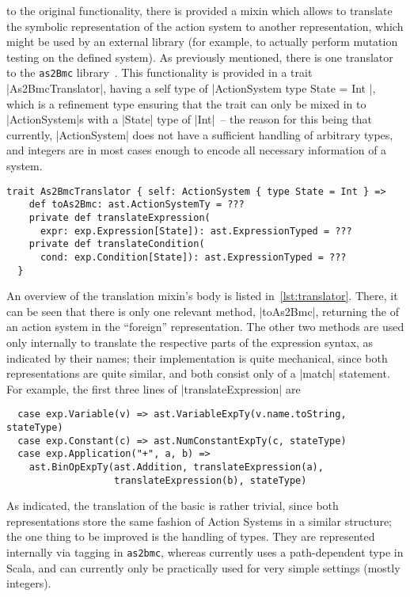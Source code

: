  to the original functionality, there is provided a mixin which
allows to translate the symbolic representation of the action system to another representation,
which might be used by an external library (for example, to actually perform mutation testing on the
defined system). As previously mentioned, there is one translator to the \texttt{as2Bmc}
library~\cite{maderbacher2016:weak}. This functionality is provided in a trait |As2BmcTranslator|,
having a self type of |ActionSystem { type State = Int }|, which is a refinement type ensuring that
the trait can only be mixed in to |ActionSystem|s with a |State| type of |Int|~-- the reason for
this being that currently, |ActionSystem| does not have a sufficient handling of arbitrary types,
and integers are in most cases enough to encode all necessary information of a system.

\begin{lstlisting}[style=floating, label=lst:translator,
  caption={Overview of the body of \texttt{As2BmcTranslator}. The actual implementations are
    left out.}]
  trait As2BmcTranslator { self: ActionSystem { type State = Int } =>
    def toAs2Bmc: ast.ActionSystemTy = ???
    private def translateExpression(
      expr: exp.Expression[State]): ast.ExpressionTyped = ???
    private def translateCondition(
      cond: exp.Condition[State]): ast.ExpressionTyped = ???
  }
\end{lstlisting}

An overview of the translation mixin's body is listed in~\autoref{lst:translator}. There, it can be
seen that there is only one relevant method, |toAs2Bmc|, returning the  of an action
system in the \enquote{foreign} representation. The other two methods are used only internally to
translate the respective parts of the expression syntax, as indicated by their names; their
implementation is quite mechanical, since both representations are quite similar, and both consist
only of a |match| statement. For example, the first three lines of |translateExpression| are
\begin{lstlisting}
  case exp.Variable(v) => ast.VariableExpTy(v.name.toString, stateType)
  case exp.Constant(c) => ast.NumConstantExpTy(c, stateType)
  case exp.Application("+", a, b) =>
    ast.BinOpExpTy(ast.Addition, translateExpression(a), 
                   translateExpression(b), stateType)
\end{lstlisting}

As indicated, the translation of the basic  is rather trivial, since both
representations store the same fashion of Action Systems in a similar structure; the one thing to be
improved is the handling of types. They are represented internally via tagging in \texttt{as2bmc},
whereas \actium{} currently uses a path-dependent type in Scala, and can currently only be
practically used for very simple settings (mostly integers).


